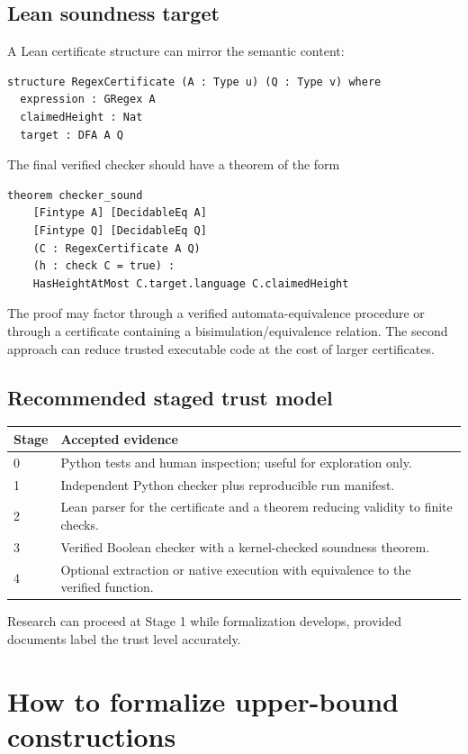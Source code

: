 \documentclass{amsart}
\begin{document}
\subsection{Lean soundness target}

A Lean certificate structure can mirror the semantic content:
\begin{lstlisting}[language={}]
structure RegexCertificate (A : Type u) (Q : Type v) where
  expression : GRegex A
  claimedHeight : Nat
  target : DFA A Q
\end{lstlisting}
The final verified checker should have a theorem of the form
\begin{lstlisting}[language={}]
theorem checker_sound
    [Fintype A] [DecidableEq A]
    [Fintype Q] [DecidableEq Q]
    (C : RegexCertificate A Q)
    (h : check C = true) :
    HasHeightAtMost C.target.language C.claimedHeight
\end{lstlisting}
The proof may factor through a verified automata-equivalence procedure or through a certificate containing a bisimulation/equivalence relation.  The second approach can reduce trusted executable code at the cost of larger certificates.

\subsection{Recommended staged trust model}

\begin{center}
\begin{tabularx}{0.96\textwidth}{@{}lX@{}}
\toprule
Stage & Accepted evidence\\
\midrule
0 & Python tests and human inspection; useful for exploration only.\\
1 & Independent Python checker plus reproducible run manifest.\\
2 & Lean parser for the certificate and a theorem reducing validity to finite checks.\\
3 & Verified Boolean checker with a kernel-checked soundness theorem.\\
4 & Optional extraction or native execution with equivalence to the verified function.\\
\bottomrule
\end{tabularx}
\end{center}
Research can proceed at Stage 1 while formalization develops, provided documents label the trust level accurately.

\section{How to formalize upper-bound constructions}
\end{document}
